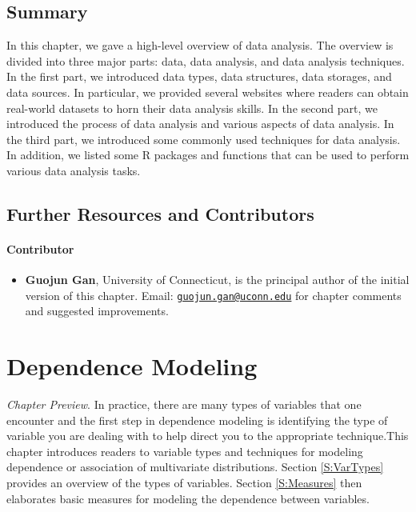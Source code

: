 \documentclass[]{book}
\providecommand{\tightlist}{%
  \setlength{\itemsep}{0pt}\setlength{\parskip}{0pt}}
\theoremstyle{definition}
\theoremstyle{definition}
\theoremstyle{definition}
\theoremstyle{remark}
\begin{document}
\section{Summary}\label{summary}

In this chapter, we gave a high-level overview of data analysis. The
overview is divided into three major parts: data, data analysis, and
data analysis techniques. In the first part, we introduced data types,
data structures, data storages, and data sources. In particular, we
provided several websites where readers can obtain real-world datasets
to horn their data analysis skills. In the second part, we introduced
the process of data analysis and various aspects of data analysis. In
the third part, we introduced some commonly used techniques for data
analysis. In addition, we listed some R packages and functions that can
be used to perform various data analysis tasks.

\section{Further Resources and
Contributors}\label{DS:further-reading-and-resources}

\subsubsection*{Contributor}\label{contributor-2}

\begin{itemize}
\tightlist
\item
  \textbf{Guojun Gan}, University of Connecticut, is the principal
  author of the initial version of this chapter. Email:
  \href{mailto:guojun.gan@uconn.edu}{\nolinkurl{guojun.gan@uconn.edu}}
  for chapter comments and suggested improvements.
\end{itemize}

\chapter{Dependence Modeling}\label{C:DependenceModel}

\emph{Chapter Preview}. In practice, there are many types of variables
that one encounter and the first step in dependence modeling is
identifying the type of variable you are dealing with to help direct you
to the appropriate technique.This chapter introduces readers to variable
types and techniques for modeling dependence or association of
multivariate distributions. Section \ref{S:VarTypes} provides an
overview of the types of variables. Section \ref{S:Measures} then
elaborates basic measures for modeling the dependence between variables.
\end{document}
